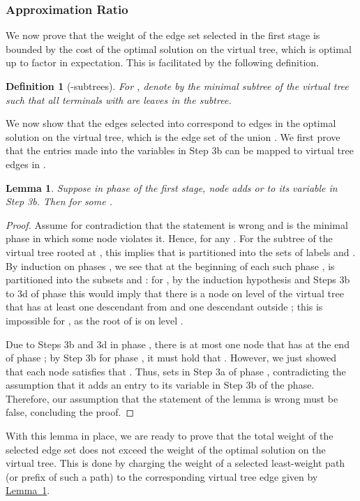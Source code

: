 \documentclass[letterpaper,11pt]{article}
\newtheorem{lemma}[theorem]{Lemma}
\newtheorem{definition}[theorem]{Definition}
\newcommand{\namedref}[2]{\hyperref[#2]{#1~\ref*{#2}}}
\newcommand{\lemmaref}[1]{\namedref{Lemma}{#1}}
\begin{document}
\subsubsection*{Approximation Ratio}

We now prove that the weight of the edge set  selected in the first stage is
bounded by the cost of the optimal solution on the virtual tree, which is
optimal up to factor  in expectation. This is facilitated by the
following definition.

\begin{definition}[-subtrees]
For , denote by  the minimal subtree of the
virtual tree such that all terminals  with  are leaves
in the subtree.
\end{definition}

We now show that the edges selected into  correspond to edges in the optimal
solution on the virtual tree, which is the edge set of the
union . We first prove that the entries
made into the  variables in Step 3b can be mapped to virtual tree edges
in .

\begin{lemma}\label{lemma:stage1_subtree}
Suppose in phase  of the first stage, node  adds
 or  to its  variable in Step 3b.
Then  for some .
\end{lemma}
\begin{proof}
Assume for contradiction that the statement is wrong and 
is the minimal phase in which some node  violates it. Hence,
 for any . For the subtree
 of the virtual tree rooted at , this implies that
 is partitioned into the sets of labels  and . By induction on phases , we see that at the beginning of each such phase , 
is partitioned into the subsets  and : for , by the induction hypothesis and
Steps 3b to 3d of phase  this would imply that there is a node  on level
 of the virtual tree that has at least one descendant from 
and one descendant outside ; this is impossible for ,
as the root of  is on level .

Due to Steps 3b and 3d in phase , there is at most one node  that has  at the end of phase ; by Step 3b
for phase , it must hold that . However, we just showed that each node
 satisfies that . Thus,  sets
 in Step 3a of phase , contradicting the assumption that it
adds an entry to its  variable in Step 3b of the phase. Therefore, our
assumption that the statement of the lemma is wrong must be false, concluding
the proof.
\end{proof}

With this lemma in place, we are ready to prove that the total weight of the
selected edge set does not exceed the weight of the optimal solution on the
virtual tree. This is done by charging the weight of a selected least-weight
path (or prefix of such a path) to the corresponding virtual tree edge given
by \lemmaref{lemma:stage1_subtree}.
\end{document}
